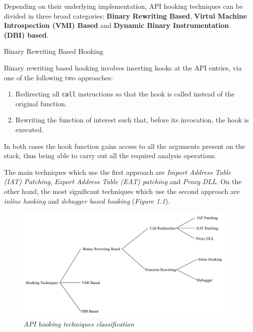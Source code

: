 \documentclass[binding=0.6cm,LaM,english,noexaminfo,oneside]{sapthesis} %
\begin{document}
Depending on their underlying implementation, API hooking techniques can be divided in three broad categories: \textbf{Binary Rewriting Based}, \textbf{Virtul Machine Introspection (VMI) Based} and \textbf{Dynamic Binary Instrumentation (DBI) based}.   

\begin{section}{Binary Rewriting Based Hooking}

Binary rewriting based hooking involves inserting hooks at the API entries, via one of the following two approaches:
\begin{enumerate}
\item Redirecting all \texttt{call} instructions so that the hook is called instead of the original function.
\item Rewriting the function of interest such that, before its invocation, the hook is executed. 
\end{enumerate} 

In both cases the hook function gains access to all the arguments present on the stack, thus being able to carry out all the required analysis operations.

The main techniques which use the first approach are \textit{Import Address Table (IAT) Patching}, \textit{Export Address Table (EAT) patching} and \textit{Proxy DLL}. On the other hand, the most significant techniques which use the second approach are \textit{inline hooking} and \textit{debugger based hooking} (\textit{Figure 1.1}).



\begin{figure}[h]
\centering
\hspace*{-3em}
\includegraphics[scale=0.8]{Figures/API-hooking-3.pdf}
\caption{\textit{API hooking techniques classification}}
\end{figure}


\end{section}
\end{document}

